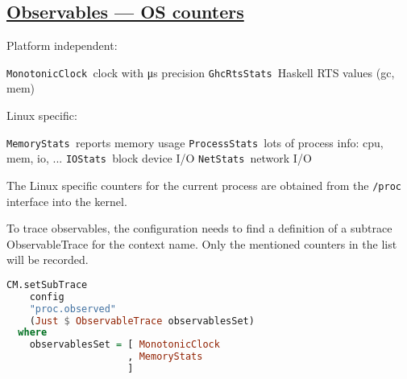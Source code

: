 \begin{mdframed}

    \section*{\href{https://github.com/The-Blockchain-Company/tbco-monitoring-framework/blob/master/tbco-monitoring/src/Bcc/BM/Data/Counter.lhs}{Observables --- OS counters}}

Platform independent:

\texttt{MonotonicClock }clock with μs precision\newline
\texttt{GhcRtsStats    }Haskell RTS values (gc, mem)

Linux specific:

\texttt{MemoryStats    }reports memory usage\newline
\texttt{ProcessStats   }lots of process info: cpu, mem, io, ...\newline
\texttt{IOStats        }block device I/O\newline
\texttt{NetStats       }network I/O

The Linux specific counters for the current process are obtained from the \texttt{/proc} interface into the kernel.

To trace observables, the configuration needs to find a definition of a subtrace ObservableTrace for the context name. Only the mentioned counters in the list will be recorded.

    \begin{lstlisting}[language=Haskell]
CM.setSubTrace
    config
    "proc.observed"
    (Just $ ObservableTrace observablesSet)
  where
    observablesSet = [ MonotonicClock
                     , MemoryStats
                     ]
    \end{lstlisting}

%
%
%
\end{mdframed}


